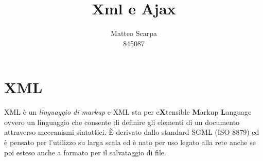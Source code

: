 \documentclass{article}
\title{Xml e Ajax}
\author{Matteo Scarpa\\ 845087}
\date{}
\begin{document}
\maketitle

\section{XML}
XML è un \textit{linguaggio di markup} e XML sta per e\textbf{X}tensible \textbf{M}arkup \textbf{L}anguage ovvero un linguaggio che consente di definire gli elementi di un documento attraverso meccanismi sintattici.
È derivato dallo standard SGML (ISO 8879) ed è pensato per l'utilizzo su larga scala ed è nato per uso legato alla rete anche se poi esteso anche a formato per il salvataggio di file.
\end{document}
